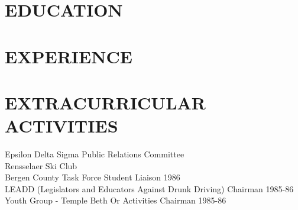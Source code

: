 \documentclass{res}
\begin{document}
 


\address{8 Douglass St. \#3F\\Cambridge, MA 02139}
\address{dylan@herts.io \\ (216) 288-2768}
                                  
\begin{resume}

\section{EDUCATION}        
    \begin{position}
    \end{position}
         

 
\section{EXPERIENCE}
 


      
 
\section{EXTRACURRICULAR ACTIVITIES}          
    Epsilon Delta Sigma Public Relations Committee \\         
    Rensselaer Ski Club     \\     
    Bergen County Task Force Student Liaison 1986  \\        
    LEADD (Legislators and Educators Against Drunk Driving) Chairman
     1985-86  \\        
    Youth Group - Temple Beth Or Activities Chairman 1985-86          
 
\end{resume}
\end{document}
